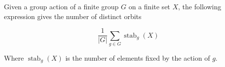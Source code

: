 \documentclass[12pt]{article}
\begin{document}
Given a group action of a finite group $G$ on a finite set $X$, the following expression gives the number of distinct orbits

$$ \frac{1}{|G|}\sum_{g\in G}\operatorname{stab}_g(X) $$

Where $\operatorname{stab}_g(X)$ is the number of elements fixed by the action of $g$.
\end{document}
